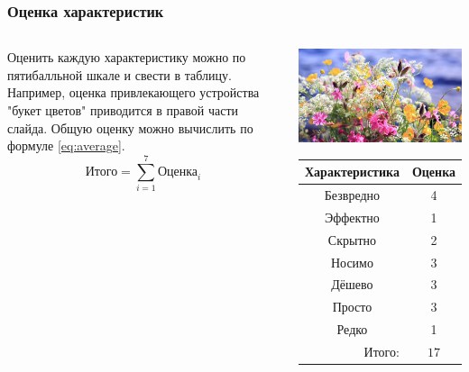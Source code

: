 \begin{frame}
    \frametitle{Оценка характеристик}

    \begin{columns}
            Оценить каждую характеристику можно по пятибалльной шкале и свести в таблицу. Например, оценка привлекающего устройства \alert{"букет цветов"} приводится в правой части слайда. Общую оценку можно вычислить по формуле \eqref{eq:average}.
            \begin{equation}
                \label{eq:average}
                \text{Итого}={\displaystyle\sum_{i=1}^{7}\text{Оценка}_i}
            \end{equation}
            
            
            \begin{center}
                \includegraphics[width=.4\textheight]{fig/flowers}
                
                \begin{tabular}{c|c}
                    \hline\hline
                    Характеристика              & Оценка\\ \hline\hline
                    Безвредно                   & 4 \\
                    Эффектно                    & 1 \\
                    Скрытно                     & 2 \\
                    Носимо                      & 3 \\
                    Дёшево                      & 3 \\
                    Просто                      & 3 \\ 
                    Редко                       & 1 \\ \hline
                    \multicolumn{1}{r|}{Итого:} & $17$ \\
                \end{tabular}
            \end{center}
    \end{columns}    
\end{frame}

